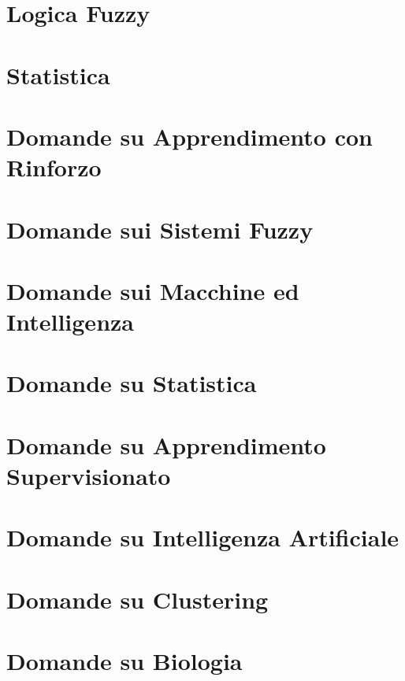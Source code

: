 \providecommand{\main}{.}








{\hypersetup{hidelinks}
	\tableofcontents  %
}

\chapter{Logica Fuzzy}


\chapter{Statistica}


\appendix
\chapter{Domande su Apprendimento con Rinforzo}


\chapter{Domande sui Sistemi Fuzzy}


\chapter{Domande sui Macchine ed Intelligenza}


\chapter{Domande su Statistica}


\chapter{Domande su Apprendimento Supervisionato}


\chapter{Domande su Intelligenza Artificiale}


\chapter{Domande su Clustering}


\chapter{Domande su Biologia}




